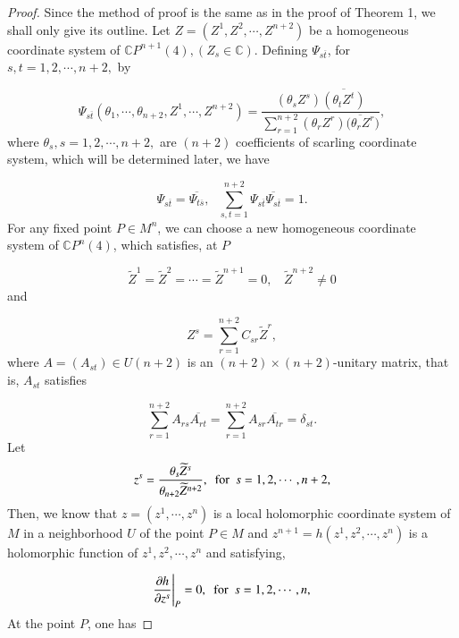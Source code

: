 \documentclass[12pt]{article}
\numberwithin{equation}{section}
\begin{document}
\begin{proof}Since the method of proof is the same as in the proof of
Theorem 1, we shall only give its outline.
Let $Z=(Z^{1},Z^{2},\cdots,Z^{n+2})$ be a homogeneous coordinate
system of $\mathbb{C}P^{n+1}(4), (Z_{s}\in \mathbb{C})$. Defining $\Psi_{s\overline{t}}$, for $s,t = 1, 2,\cdots,n+2,$ by

\begin{equation*}\Psi_{s\overline{t}}(\theta_{1},\cdots,\theta_{n+2},Z^{1},\cdots,Z^{n+2})=\frac{(\theta_{s}Z^{s})
\overline{(\theta_{t}Z^{t})}}{\sum^{n+2}_{r=1}(\theta_{r}Z^{r})\overline{(\theta_{r}Z^{r}})},
\end{equation*}where $\theta_{s}, s= 1,2,\cdots,n+2,$ are $(n+2)$ coefficients of scarling coordinate system, which will be determined later,
we have

\begin{equation*}\Psi_{s\overline{t}} = \overline{\Psi_{t\overline{s}}},\ \ \ \sum^{n+2}_{s,t=1}\Psi_{s\overline{t}}\overline{\Psi_{s\overline{t}}} = 1.\end{equation*}
For any fixed point $P\in M^{n}$, we can choose a new homogeneous coordinate system of
$\mathbb{C}P^{n}(4)$, which satisfies, at $P$


\begin{equation*}\widetilde{Z}^{1}=\widetilde{Z}^{2}=\cdots=\widetilde{Z}^{n+1}=0,\ \ \ \ \widetilde{Z}^{n+2}\neq0
\end{equation*} and



\begin{equation*}Z^{s}=\sum^{n+2}_{r=1}C_{sr}\widetilde{Z}^{r},
\end{equation*}
where $A= (A_{st})\in U(n + 2)$ is an $(n+2)\times(n+2)$-unitary matrix, that is, $A_{st}$ satisfies


\begin{equation*} \sum^{n+2}_{r=1}A_{rs}\overline{A_{rt}}=\sum^{n+2}_{r=1}A_{sr}\overline{A_{tr}}=\delta_{st}.
\end{equation*}Let
$$z^{s}=\frac{\theta_{s}\widetilde{Z}^{s}}{\theta_{n+2}\widetilde{Z}^{n+2}},\ \ {\rm for}\ \ s=1,2,\cdots,n+2,$$
Then, we know that $z = (z^{1},\cdots,z^{n})$ is a local holomorphic coordinate
system of $M$ in a neighborhood $U$ of the point $P\in M$ and $z^{n+1}=h(z^{1},z^{2},\cdots,z^{n})$
is a holomorphic function of $z^{1},z^{2},\cdots,z^{n}$ and satisfying,

\begin{equation*}\frac{\partial h}{\partial z^{s}} \Bigg{|}_{P}=0,\ \ {\rm for}\ \ s=1,2,\cdots,n,
\end{equation*}
At the point $P$, one has


\end{proof}
\end{document}
